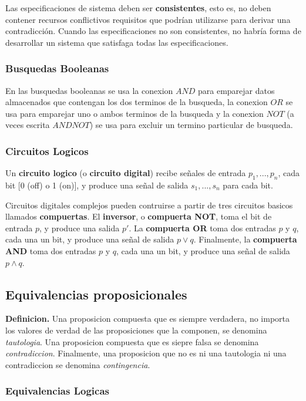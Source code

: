 \documentclass[]{article}
\begin{document}
Las especificaciones de sistema deben ser \textbf{consistentes}, esto es, no deben contener recursos conflictivos requisitos que podrían utilizarse para derivar una contradicción. Cuando las especificaciones no son consistentes, no habría forma de desarrollar un sistema que satisfaga todas las especificaciones.

\subsubsection*{Busquedas Booleanas}

En las busquedas booleanas se usa la conexion $AND$ para emparejar datos almacenados que contengan los dos terminos de la busqueda, la conexion $OR$ se usa para emparejar uno o ambos terminos de la busqueda y la conexion $NOT$ (a veces escrita $AND NOT$) se usa para excluir un termino particular de busqueda.

\subsubsection*{Circuitos Logicos}

Un \textbf{circuito logico} (o \textbf{circuito digital}) recibe señales de entrada $p_{1}, ..., p_{n}$, cada bit [0 (off) o 1 (on)], y produce una señal de salida $s_{1}, ..., s_{n}$ para cada bit.

Circuitos digitales complejos pueden contruirse a partir de tres circuitos basicos llamados \textbf{compuertas}. El \textbf{inversor}, o \textbf{compuerta NOT}, toma el bit de entrada $p$, y produce una salida $p'$. La \textbf{compuerta OR} toma dos entradas $p$ y $q$, cada una un bit, y produce una señal de salida $p \vee q$. Finalmente, la \textbf{compuerta AND} toma dos entradas $p$ y $q$, cada una un bit, y produce una señal de salida $p \wedge q$.

\subsection{Equivalencias proposicionales}

\textbf{Definicion.} Una proposicion compuesta que es siempre verdadera, no importa los valores de verdad de las proposiciones que la componen, se denomina \textit{tautologia}. Una proposicion compuesta que es siepre falsa se denomina \textit{contradiccion}. Finalmente, una proposicion que no es ni una tautologia ni una contradiccion se denomina \textit{contingencia}.

\subsubsection*{Equivalencias Logicas}
\end{document}
